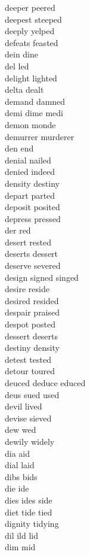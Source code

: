 deeper peered\\
deepest steeped\\
deeply yelped\\
defeats feasted\\
dein dine\\
del led\\
delight lighted\\
delta dealt\\
demand damned\\
demi dime medi\\
demon monde\\
demurrer murderer\\
den end\\
denial nailed\\
denied indeed\\
density destiny\\
depart parted\\
deposit posited\\
depress pressed\\
der red\\
desert rested\\
deserts dessert\\
deserve severed\\
design signed singed\\
desire reside\\
desired resided\\
despair praised\\
despot posted\\
dessert deserts\\
destiny density\\
detest tested\\
detour toured\\
deuced deduce educed\\
deus sued used\\
devil lived\\
devise sieved\\
dew wed\\
dewily widely\\
dia aid\\
dial laid\\
dibs bids\\
die ide\\
dies ides side\\
diet tide tied\\
dignity tidying\\
dil ild lid\\
dim mid\\
